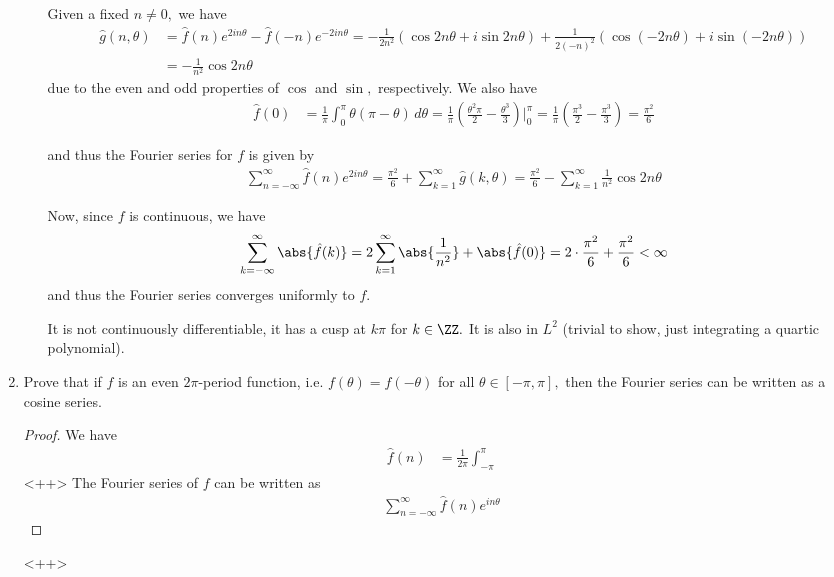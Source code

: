 \documentclass{article}
\begin{document}
\begin{enumerate}
\begin{enumerate}[(a)]
\begin{soln}
				Given a fixed $n\neq0,$ we have
				\begin{align*}
					\hat g(n, \theta) &= \hat f(n)e^{2in\theta} - \hat f(-n) e^{-2in\theta} = -\frac{1}{2n^2} \left( \cos 2n\theta + i\sin 2n\theta \right) + \frac{1}{2(-n)^2}\left( \cos(-2n\theta) + i\sin(-2n\theta) \right) \\
					&= -\frac{1}{n^2}\cos2n\theta
				\end{align*}
				due to the even and odd properties of $\cos$ and $\sin,$ respectively. We also have
				\begin{align*}
					\hat f(0) &= \frac{1}{\pi}\int_0^\pi \theta(\pi-\theta)\, d\theta = \frac{1}{\pi}\left( \frac{\theta^2\pi}{2} - \frac{\theta^3}{3} \right)\bigg\vert_0^\pi = \frac{1}{\pi} \left( \frac{\pi^3}{2} - \frac{\pi^3}{3} \right) = \frac{\pi^2}{6}
				\end{align*}

				and thus the Fourier series for $f$ is given by
				\begin{align*}
					\sum_{n=-\infty}^{\infty} \hat f(n)e^{2in\theta} = \frac{\pi^2}{6} + \sum_{k=1}^{\infty} \hat g(k, \theta) = \frac{\pi^2}{6} - \sum_{k=1}^{\infty} \frac{1}{n^2}\cos 2n\theta
				\end{align*}

				Now, since $f$ is continuous, we have
				\begin{align*}
					\sum_{k=-\infty}^{\infty} \abs{\hat f(k)} = 2\sum_{k=1}^{\infty} \abs{\frac{1}{n^2}} + \abs{\hat f(0)} = 2\cdot\frac{\pi^2}{6}+\frac{\pi^2}{6} < \infty
				\end{align*}
				and thus the Fourier series converges uniformly to $f.$ 

				It is not continuously differentiable, it has a cusp at $k\pi$ for $k\in\ZZ.$ It is also in $L^2$ (trivial to show, just integrating a quartic polynomial).
			\end{soln}
			
		\end{enumerate}

	\item Prove that if $f$ is an even $2\pi$-period function, i.e. $f(\theta)=f(-\theta)$ for all $\theta\in[-\pi, \pi],$ then the Fourier series can be written as a cosine series. 
		\begin{proof}
			We have
			\begin{align*}
				\hat f(n) &= \frac{1}{2\pi}\int_{-\pi}^\pi 
			\end{align*}<++>
			The Fourier series of $f$ can be written as
			\begin{align*}
				\sum_{n=-\infty}^{\infty} \hat f(n) e^{in\theta} 
			\end{align*}
		\end{proof}<++>
		
\end{enumerate}
\end{document}
